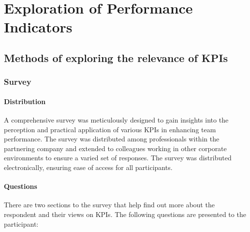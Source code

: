 \chapter{Exploration of Performance Indicators} 

\label{Chapter4} 

\section{Methods of exploring the relevance of KPIs}

\subsection{Survey}

\subsubsection{Distribution}

A comprehensive survey was meticulously designed to gain insights 
into the perception and practical application of various KPIs in 
enhancing team performance. 
The survey was distributed among professionals within the partnering 
company and extended to colleagues working in other corporate 
environments to ensure a varied set of responses.
The survey was distributed electronically, ensuring 
ease of access for all participants. 

\subsubsection{Questions}

There are two sections to the survey that help find out more 
about the respondent and their views on KPIs. 
The following questions are presented to the participant:

